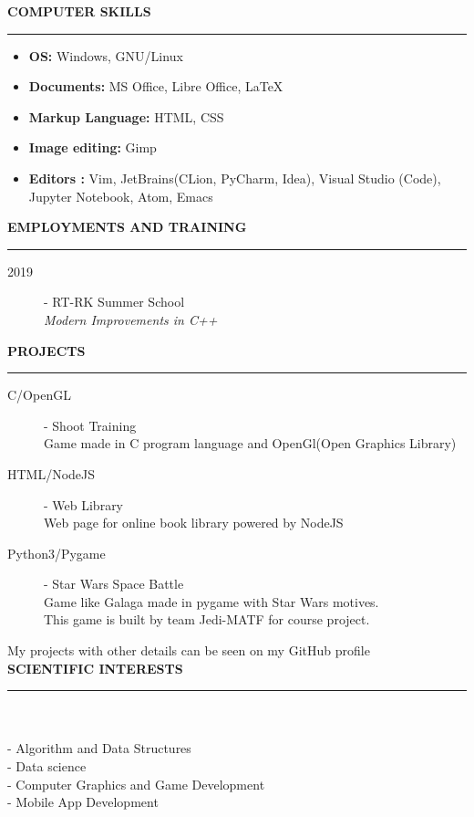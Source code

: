 \documentclass{article}
\begin{document}
\color{my_col}
\textbf{\large COMPUTER SKILLS}\\
\noindent\rule{15.4cm}{1.6pt}\color{black}
\normalsize
   \begin{multicols}{2}
  	\begin{itemize}
  		\item\textbf{OS: 	} Windows, GNU/Linux
  		\item\textbf{Documents:} MS Office, Libre Office, \LaTeX
  		\item\textbf{Markup Language: } HTML, CSS\\
  		\item\textbf{Image editing: } Gimp
  		\item\textbf{Editors :} Vim, JetBrains(CLion, PyCharm, Idea),
  		Visual Studio (Code), Jupyter Notebook, Atom, Emacs\\
 
  	\end{itemize}
  \end{multicols}

\color{my_col}
\textbf{\large EMPLOYMENTS AND TRAINING}\\
\noindent\rule{15.4cm}{1.6pt}\color{black}
\begin{description}
	\item[ 2019] - RT-RK Summer School \\
	\textit{Modern Improvements in C++}\\
\end{description}

\color{my_col}
\textbf{\large PROJECTS}\\
\noindent\rule{15.4cm}{1.6pt}\color{black}
\begin{description}
	\item[ C/OpenGL] - Shoot Training\\ 
	Game made in C program language and OpenGl(Open Graphics Library)
	\item[ HTML/NodeJS] - Web Library\\ 
	Web page for online book library powered by NodeJS
	\item[ Python3/Pygame] - Star Wars Space Battle\\ 
	Game like Galaga made in pygame with Star Wars motives.\\
	This game is built by team Jedi-MATF for course project.
\end{description}
My projects with other details can be seen on my GitHub profile \\

\color{my_col}
\textbf{\large SCIENTIFIC INTERESTS}\\
\noindent\rule{15.4cm}{1.6pt}\color{black}\\\\
- Algorithm and Data Structures\\
- Data science \\
- Computer Graphics and Game Development\\
- Mobile App Development\\
\end{document}
